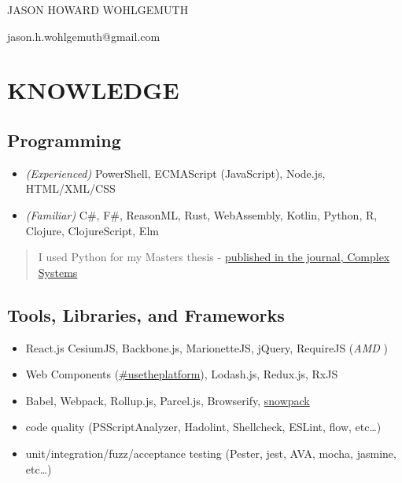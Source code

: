 \documentclass[10pt]{article}
\def\tightlist{}
\begin{document}
\begin{center}\Huge {JASON HOWARD WOHLGEMUTH}\end{center}
\begin{center}jason.h.wohlgemuth@gmail.com\end{center}

\hypertarget{knowledge}{%
\section{KNOWLEDGE}\label{knowledge}}

\hypertarget{programming}{%
\subsection{Programming}\label{programming}}

\begin{itemize}
\tightlist
\item
  \emph{(Experienced)} PowerShell, ECMAScript (JavaScript), Node.js,
  HTML/XML/CSS
\item
  \emph{(Familiar)} C\#, F\#, ReasonML, Rust, WebAssembly, Kotlin,
  Python, R, Clojure, ClojureScript, Elm
\end{itemize}

\begin{quote}
I used Python for my Masters thesis -
\href{https://www.complex-systems.com/abstracts/v23_i03_a01/}{published
in the journal, Complex Systems}
\end{quote}

\hypertarget{tools-libraries-and-frameworks}{%
\subsection{Tools, Libraries, and
Frameworks}\label{tools-libraries-and-frameworks}}

\begin{itemize}
\tightlist
\item
  React.js CesiumJS, Backbone.js, MarionetteJS, jQuery, RequireJS
  (\emph{AMD })
\item
  Web Components
  (\href{https://twitter.com/hashtag/usetheplatform?src=hash}{\#usetheplatform}),
  Lodash.js, Redux.js, RxJS
\item
  Babel, Webpack, Rollup.js, Parcel.js, Browserify,
  \href{https://www.pika.dev/blog/pika-web-a-future-without-webpack/}{snowpack}
\item
  code quality (PSScriptAnalyzer, Hadolint, Shellcheck, ESLint, flow,
  etc\ldots)
\item
  unit/integration/fuzz/acceptance testing (Pester, jest, AVA, mocha,
  jasmine, etc\ldots)
\end{itemize}
\end{document}

